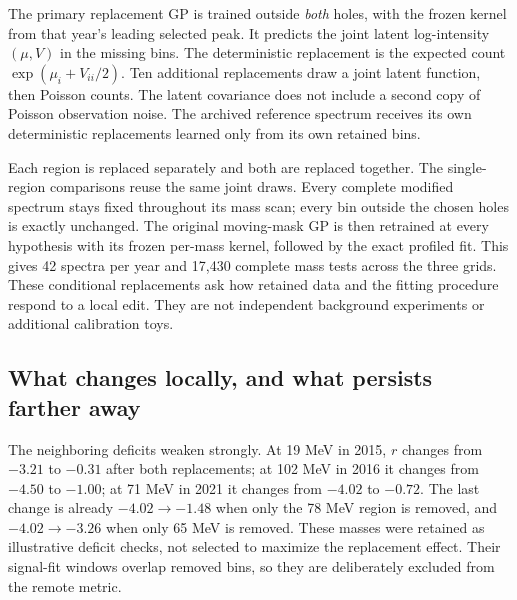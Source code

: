 The primary replacement GP is trained outside \emph{both} holes, with the frozen kernel from that year's leading selected peak. It predicts the joint latent log-intensity $(\mu,V)$ in the missing bins. The deterministic replacement is the expected count $\exp(\mu_i+V_{ii}/2)$. Ten additional replacements draw a joint latent function, then Poisson counts. The latent covariance does not include a second copy of Poisson observation noise. The archived reference spectrum receives its own deterministic replacements learned only from its own retained bins.

Each region is replaced separately and both are replaced together. The single-region comparisons reuse the same joint draws. Every complete modified spectrum stays fixed throughout its mass scan; every bin outside the chosen holes is exactly unchanged. The original moving-mask GP is then retrained at every hypothesis with its frozen per-mass kernel, followed by the exact profiled fit. This gives 42 spectra per year and 17,430 complete mass tests across the three grids. These conditional replacements ask how retained data and the fitting procedure respond to a local edit. They are not independent background experiments or additional calibration toys.

\clearpage
{}

\clearpage
\subsection{What changes locally, and what persists farther away}
The neighboring deficits weaken strongly. At 19 MeV in 2015, $r$ changes from $-3.21$ to $-0.31$ after both replacements; at 102 MeV in 2016 it changes from $-4.50$ to $-1.00$; at 71 MeV in 2021 it changes from $-4.02$ to $-0.72$. The last change is already $-4.02\to-1.48$ when only the 78 MeV region is removed, and $-4.02\to-3.26$ when only 65 MeV is removed. These masses were retained as illustrative deficit checks, not selected to maximize the replacement effect. Their signal-fit windows overlap removed bins, so they are deliberately excluded from the remote metric.

